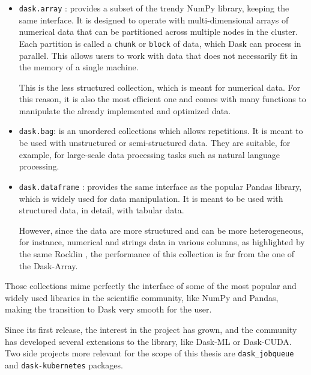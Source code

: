 \begin{itemize}
  \itemsep0em
  \item \texttt{dask.array} \cite{daskdoc-array}: provides a subset of the
    trendy NumPy library, keeping the same interface. It is designed to operate
    with multi-dimensional arrays of numerical data that can be partitioned
    across multiple nodes in the cluster. Each partition is called a
    \texttt{chunk} or \texttt{block} of data, which Dask can process in parallel.
    This allows users to work with data that does not necessarily fit in the memory
    of a single machine.

    This is the less structured collection, which is meant for numerical data.
    For this reason, it is also the most efficient one and comes with many
    functions to manipulate the already implemented and optimized data.
  \item \texttt{dask.bag}: is an unordered collections which allows repetitions.
    It is meant to be used with unstructured or semi-structured data. They are
    suitable, for example, for large-scale data processing tasks such as natural
    language processing.
  \item \texttt{dask.dataframe} \cite{daskdoc-dataframe}: provides the same
    interface as the popular Pandas library, which is widely used for data
    manipulation. It is meant to be used with structured data, in detail, with
    tabular data.

    However, since the data are more structured and can be more heterogeneous,
    for instance, numerical and strings data in various columns, as highlighted
    by the same Rocklin \cite{dask2015}, the performance of this collection is
    far from the one of the Dask-Array.
\end{itemize}

Those collections mime perfectly the interface of some of the most popular and
widely used libraries in the scientific community, like NumPy and Pandas, making
the transition to Dask very smooth for the user.

Since its first release, the interest in the project has grown, and the
community has developed several extensions to the library, like Dask-ML or
Dask-CUDA.
Two side projects more relevant for the scope of this thesis are
\texttt{dask\_jobqueue} and \texttt{dask-kubernetes} packages.

